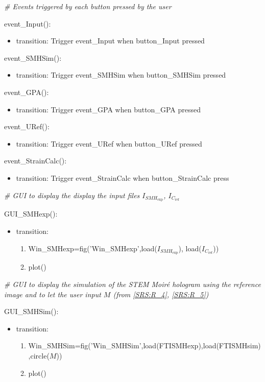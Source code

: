 \documentclass[12pt, titlepage]{article}
\begin{document}
\noindent\textit{{\#} Events triggered by each button pressed by the user}\medskip

\noindent event{\_}Input():
\begin{itemize}
\item transition: Trigger event{\_}Input when button{\_}Input pressed
\end{itemize}
\bigskip
\noindent event{\_}SMHSim():
\begin{itemize}
\item transition: Trigger event{\_}SMHSim when button{\_}SMHSim pressed
\end{itemize}
\bigskip
\noindent event{\_}GPA():
\begin{itemize}
\item transition: Trigger event{\_}GPA when button{\_}GPA pressed
\end{itemize}
\bigskip
\noindent event{\_}URef():
\begin{itemize}
\item transition: Trigger event{\_}URef when button{\_}URef pressed
\end{itemize}
\bigskip
\noindent event{\_}StrainCalc():
\begin{itemize}
\item transition: Trigger event{\_}StrainCalc when button{\_}StrainCalc press
\end{itemize}
\bigskip

\noindent\textit{{\#} GUI to display the display the input files $I_{\mathit{SMH}_{\text{exp}}}$, $I_{C_{\text{ref}}}$}\medskip

\noindent GUI{\_}SMHexp():
\begin{itemize}
\item transition: 
	\begin{enumerate}
	\item Win{\_}SMHexp=fig('Win{\_}SMHexp',load($I_{\mathit{SMH}_{\text{exp}}}$), load($I_{C_{\text{ref}}}$))
	\item plot()
	\end{enumerate} 
\end{itemize}
\bigskip


\noindent\textit{{\#} GUI to display the simulation of the STEM Moir{\'e} hologram using the reference image and to let the user input $M$ (from \cref{SRS:R_4}, \cref{SRS:R_5})}\medskip

\noindent GUI{\_}SMHSim():
\begin{itemize}
\item transition: 
	\begin{enumerate}
	\item Win{\_}SMHSim=fig('Win{\_}SMHSim',load(FTISMHexp),load(FTISMHsim),circle($M$))
	\item plot()
	\end{enumerate} 
\end{itemize}
\bigskip
\end{document}
